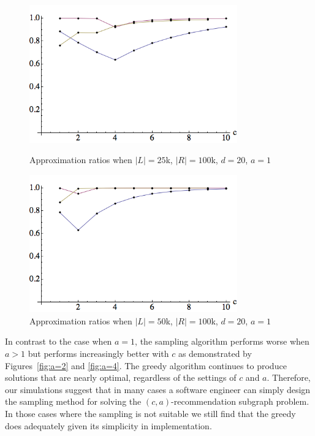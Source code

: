 \begin{figure}[h]
\centering
\begin{minipage}[h]{0.45\textwidth}
\centering
\includegraphics[width=0.8\textwidth]{images/l=25000,r=100000_Greedy_vs_Naive.png}
\caption{Approximation ratios when $|L|=25$k, $|R|=100$k, $d=20$, $a=1$}\label{fig:a=1:1}
\end{minipage}
\hspace{0.2cm}
\begin{minipage}[h]{0.45\textwidth}
\centering
\includegraphics[width=0.8\textwidth]{images/l=50000,r=100000_Greedy_vs_Naive.png}
\caption{Approximation ratios when $|L|=50$k, $|R|=100$k, $d=20$, $a=1$}\label{fig:a=1:2}
\end{minipage}
\end{figure}



In contrast to the case when $a=1$, the sampling algorithm performs
worse when $a>1$ but performs increasingly better with $c$ as
demonstrated by Figures~\ref{fig:a=2} and \ref{fig:a=4}. The greedy
algorithm continues to produce solutions that are nearly optimal,
regardless of the settings of $c$ and $a$. Therefore, our simulations
suggest that in many cases a software engineer can simply design the
sampling method for solving the $(c, a)$-recommendation subgraph
problem. In those cases where the sampling is not suitable we still
find that the greedy does adequately given its simplicity in
implementation.

